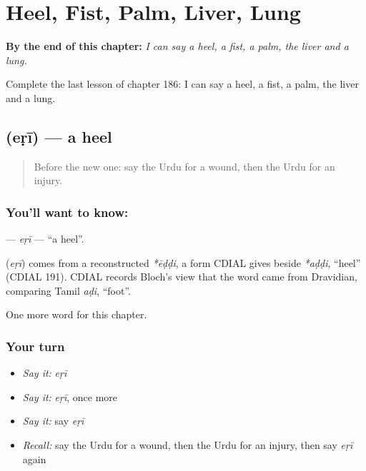 
\chapter{Heel, Fist, Palm, Liver, Lung}
\label{ch:ur-heel-fist-palm-liver-lung}

\begin{chapteropening}
\textbf{By the end of this chapter:} \emph{I can say a heel, a fist, a palm, the liver and a lung.}

Complete the last lesson of chapter 186: I can say a heel, a fist, a palm, the liver and a lung.
\end{chapteropening}

\section[\texorpdfstring{\ur{ایڑی} (eṛī)}{ایڑی (eṛī)}]{ (eṛī) — a heel}

\label{lesson:UR-C186-eri}



\begin{quote}
Before the new one: say the Urdu for a wound, then the Urdu for an injury.
\end{quote}

\subsection*{You'll want to know: }
\textbf{} — \emph{eṛī} — \textquotedblleft{}a heel\textquotedblright{}.

\begin{cousinweb}
\textbf{} (\emph{eṛī}) comes from a reconstructed \emph{*ēḍḍi}, a form CDIAL gives beside \emph{*aḍḍi}, \textquotedblleft{}heel\textquotedblright{} (CDIAL 191). CDIAL records Bloch's view that the word came from Dravidian, comparing Tamil \emph{aḍi}, \textquotedblleft{}foot\textquotedblright{}.
\end{cousinweb}

\begin{grammarlens}[title={What you've built}]
One more word for this chapter.
\end{grammarlens}

\subsection*{Your turn}
\begin{itemize}
\raggedright
  \item \emph{Say it:} \emph{eṛī}
  \item \emph{Say it:} \emph{eṛī}, once more
  \item \emph{Say it:} say \emph{eṛī}
  \item \emph{Recall:} say the Urdu for a wound, then the Urdu for an injury, then say \emph{eṛī} again
\end{itemize}

